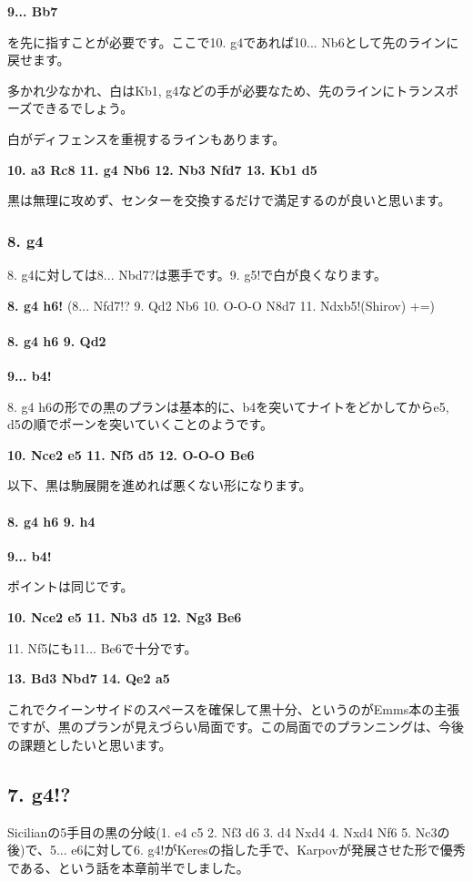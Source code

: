 {\bf 9... Bb7}

を先に指すことが必要です。ここで10. g4であれば10... Nb6として先のラインに戻せます。

多かれ少なかれ、白はKb1, g4などの手が必要なため、先のラインにトランスポーズできるでしょう。

白がディフェンスを重視するラインもあります。

{\bf 10. a3 Rc8 11. g4 Nb6 12. Nb3 Nfd7 13. Kb1 d5}

黒は無理に攻めず、センターを交換するだけで満足するのが良いと思います。

\subsubsection{8. g4}

8. g4に対しては8... Nbd7?は悪手です。9. g5!で白が良くなります。

{\bf 8. g4 h6!} (8... Nfd7!? 9. Qd2 Nb6 10. O-O-O N8d7 11. Ndxb5!(Shirov) +=)

\paragraph{8. g4 h6 9. Qd2}
\mbox{}\newline

{\bf 9... b4!}

8. g4 h6の形での黒のプランは基本的に、b4を突いてナイトをどかしてからe5, d5の順でポーンを突いていくことのようです。

{\bf 10. Nce2 e5 11. Nf5 d5 12. O-O-O Be6}

以下、黒は駒展開を進めれば悪くない形になります。


\paragraph{8. g4 h6 9. h4}

{\bf 9... b4!}

ポイントは同じです。

{\bf 10. Nce2 e5 11. Nb3 d5 12. Ng3 Be6}

11. Nf5にも11... Be6で十分です。

{\bf 13. Bd3 Nbd7 14. Qe2 a5}

これでクイーンサイドのスペースを確保して黒十分、というのがEmms本の主張ですが、黒のプランが見えづらい局面です。この局面でのプランニングは、今後の課題としたいと思います。

\subsection{7. g4!?}
Sicilianの5手目の黒の分岐(1. e4 c5 2. Nf3 d6 3. d4 Nxd4 4. Nxd4 Nf6 5. Nc3の後)で、5... e6に対して6. g4!がKeresの指した手で、Karpovが発展させた形で優秀である、という話を本章前半でしました。

